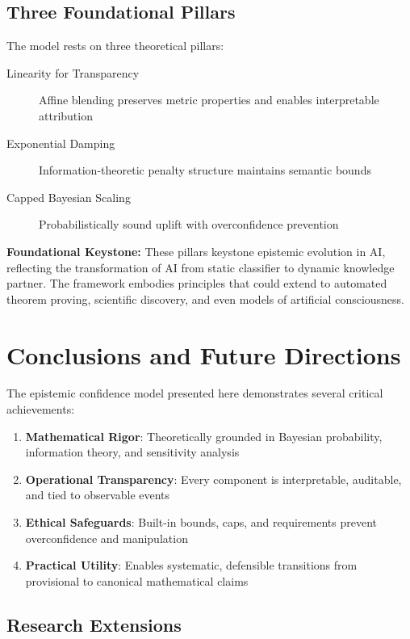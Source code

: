 \documentclass[12pt,a4paper]{article}
\theoremstyle{definition}
\theoremstyle{remark}
\begin{document}
\subsection{Three Foundational Pillars}

The model rests on three theoretical pillars:

\begin{description}
    \item[Linearity for Transparency] Affine blending preserves metric properties and enables interpretable attribution
    \item[Exponential Damping] Information-theoretic penalty structure maintains semantic bounds
    \item[Capped Bayesian Scaling] Probabilistically sound uplift with overconfidence prevention
\end{description}

\begin{reflectionbox}
\textbf{Foundational Keystone:} These pillars keystone epistemic evolution in AI, reflecting the transformation of AI from static classifier to dynamic knowledge partner. The framework embodies principles that could extend to automated theorem proving, scientific discovery, and even models of artificial consciousness.
\end{reflectionbox}

\section{Conclusions and Future Directions}

The epistemic confidence model presented here demonstrates several critical achievements:

\begin{enumerate}
    \item \textbf{Mathematical Rigor}: Theoretically grounded in Bayesian probability, information theory, and sensitivity analysis
    \item \textbf{Operational Transparency}: Every component is interpretable, auditable, and tied to observable events
    \item \textbf{Ethical Safeguards}: Built-in bounds, caps, and requirements prevent overconfidence and manipulation
    \item \textbf{Practical Utility}: Enables systematic, defensible transitions from provisional to canonical mathematical claims
\end{enumerate}

\subsection{Research Extensions}
\end{document}
